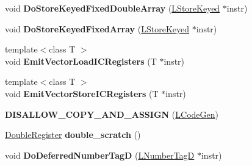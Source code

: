 \begin{DoxyCompactItemize}
\item 
void {\bfseries Do\+Store\+Keyed\+Fixed\+Double\+Array} (\hyperlink{classv8_1_1internal_1_1_l_store_keyed}{L\+Store\+Keyed} $\ast$instr)\hypertarget{classv8_1_1internal_1_1_l_code_gen_af87a3bb48b2b2ce3880ca8aacf62b397}{}\label{classv8_1_1internal_1_1_l_code_gen_af87a3bb48b2b2ce3880ca8aacf62b397}

\item 
void {\bfseries Do\+Store\+Keyed\+Fixed\+Array} (\hyperlink{classv8_1_1internal_1_1_l_store_keyed}{L\+Store\+Keyed} $\ast$instr)\hypertarget{classv8_1_1internal_1_1_l_code_gen_a126ac600bb5f30c98bef6e57a096d9a9}{}\label{classv8_1_1internal_1_1_l_code_gen_a126ac600bb5f30c98bef6e57a096d9a9}

\item 
{\footnotesize template$<$class T $>$ }\\void {\bfseries Emit\+Vector\+Load\+I\+C\+Registers} (T $\ast$instr)\hypertarget{classv8_1_1internal_1_1_l_code_gen_a31e396d22475d9c9dec1ac0e5030380a}{}\label{classv8_1_1internal_1_1_l_code_gen_a31e396d22475d9c9dec1ac0e5030380a}

\item 
{\footnotesize template$<$class T $>$ }\\void {\bfseries Emit\+Vector\+Store\+I\+C\+Registers} (T $\ast$instr)\hypertarget{classv8_1_1internal_1_1_l_code_gen_a84c9b0e87f89361233a5c74e43d689cb}{}\label{classv8_1_1internal_1_1_l_code_gen_a84c9b0e87f89361233a5c74e43d689cb}

\item 
{\bfseries D\+I\+S\+A\+L\+L\+O\+W\+\_\+\+C\+O\+P\+Y\+\_\+\+A\+N\+D\+\_\+\+A\+S\+S\+I\+GN} (\hyperlink{classv8_1_1internal_1_1_l_code_gen}{L\+Code\+Gen})\hypertarget{classv8_1_1internal_1_1_l_code_gen_a475eb7b3d7738263ae865905cf36b985}{}\label{classv8_1_1internal_1_1_l_code_gen_a475eb7b3d7738263ae865905cf36b985}

\item 
\hyperlink{structv8_1_1internal_1_1_double_register}{Double\+Register} {\bfseries double\+\_\+scratch} ()\hypertarget{classv8_1_1internal_1_1_l_code_gen_a8dc5e9ac6d5ac31598014131d518d0b1}{}\label{classv8_1_1internal_1_1_l_code_gen_a8dc5e9ac6d5ac31598014131d518d0b1}

\item 
void {\bfseries Do\+Deferred\+Number\+TagD} (\hyperlink{classv8_1_1internal_1_1_l_number_tag_d}{L\+Number\+TagD} $\ast$instr)\hypertarget{classv8_1_1internal_1_1_l_code_gen_af3b589c0911c5e01a018ecee64b7e926}{}\label{classv8_1_1internal_1_1_l_code_gen_af3b589c0911c5e01a018ecee64b7e926}


\end{DoxyCompactItemize}
